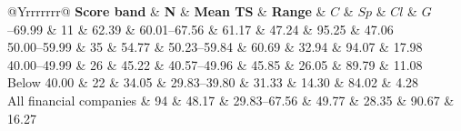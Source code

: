 \documentclass[11pt,a4paper,onecolumn]{article}
\newcommand{\checktablebox}[2]{%
\begin{lrbox}{#1}\begin{minipage}{\textwidth}\captionsetup{type=table}#2\end{minipage}\end{lrbox}%
\ifdim\dimexpr\ht#1+\dp#1\relax>\textheight
\PackageError{GRASP-layout}{A compact table exceeds one page}{Reduce table height before publication.}%
\fi
\ifdim\wd#1>\textwidth
\PackageError{GRASP-layout}{A compact table exceeds the text width}{Reduce table width before publication.}%
\fi
\noindent\usebox{#1}\clearpage}
\begin{document}
\checktablebox{\financialcheck}{
\centering\small
\caption{All 94 financial-sector companies summarised by score band. Component columns are group means in percent; TS is the mean composite. The four disjoint bands retain every company. Supplementary Table S1 provides the complete company listing, reconstructed filing years, and sector percentiles.}
\label{tab:all_financial}
\begin{tabularx}{\linewidth}{@{}Yrrrrrrr@{}}
\toprule\textbf{Score band} & \textbf{N} & \textbf{Mean TS} & \textbf{Range} & \textbf{$C$} & \textbf{$Sp$} & \textbf{$Cl$} & \textbf{$G$}\\\midrule
60.00--69.99 & 11 & 62.39 & 60.01--67.56 & 61.17 & 47.24 & 95.25 & 47.06 \\
50.00--59.99 & 35 & 54.77 & 50.23--59.84 & 60.69 & 32.94 & 94.07 & 17.98 \\
40.00--49.99 & 26 & 45.22 & 40.57--49.96 & 45.85 & 26.05 & 89.79 & 11.08 \\
Below 40.00 & 22 & 34.05 & 29.83--39.80 & 31.33 & 14.30 & 84.02 & 4.28 \\
\midrule
All financial companies & 94 & 48.17 & 29.83--67.56 & 49.77 & 28.35 & 90.67 & 16.27\\\bottomrule
\end{tabularx}
}
\end{document}
